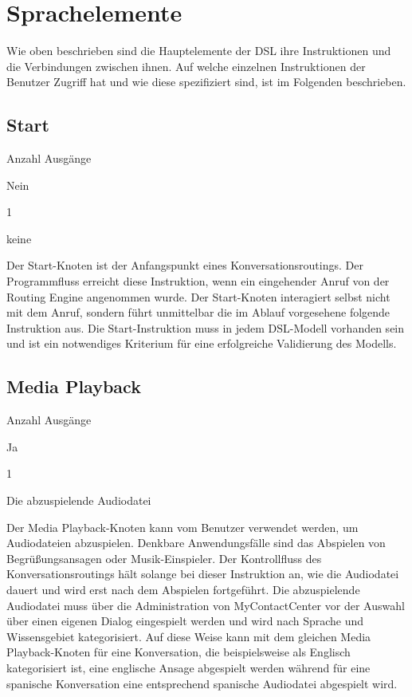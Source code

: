\section{Sprachelemente}
\label{sec:Sprachelemente}
Wie oben beschrieben sind die Hauptelemente der DSL ihre Instruktionen und die Verbindungen zwischen ihnen. Auf welche einzelnen Instruktionen der Benutzer Zugriff hat und wie diese spezifiziert sind, ist im Folgenden beschrieben. 

\subsection{Start}
\begin{labeling}{Anzahl Ausgänge}
\item [Eingang] Nein
\item [Anzahl Ausgänge] 1
\item [Parameter] keine
\item [Beschreibung] Der Start-Knoten ist der Anfangspunkt eines Konversationsroutings. Der Programmfluss erreicht diese Instruktion, wenn ein eingehender Anruf von der Routing Engine angenommen wurde. Der Start-Knoten interagiert selbst nicht mit dem Anruf, sondern führt unmittelbar die im Ablauf vorgesehene folgende Instruktion aus. Die Start-Instruktion muss in jedem DSL-Modell vorhanden sein und ist ein notwendiges Kriterium für eine erfolgreiche Validierung des Modells. 
\end{labeling}

\subsection{Media Playback}
\label{subsec:Media Playback}
\begin{labeling}{Anzahl Ausgänge}
\item [Eingang] Ja
\item [Anzahl Ausgänge] 1
\item [Parameter] Die abzuspielende Audiodatei
\item [Beschreibung] Der Media Playback-Knoten kann vom Benutzer verwendet werden, um Audiodateien abzuspielen. Denkbare Anwendungsfälle sind das Abspielen von Begrüßungsansagen oder Musik-Einspieler. Der Kontrollfluss des Konversationsroutings hält solange bei dieser Instruktion an, wie die Audiodatei dauert und wird erst nach dem Abspielen fortgeführt.  Die abzuspielende Audiodatei muss über die Administration von MyContactCenter vor der Auswahl über einen eigenen Dialog eingespielt werden und wird nach Sprache und Wissensgebiet kategorisiert. Auf diese Weise kann mit dem gleichen Media Playback-Knoten für eine Konversation, die beispielsweise als Englisch kategorisiert ist, eine englische Ansage abgespielt werden während für eine spanische Konversation eine entsprechend spanische Audiodatei abgespielt wird.
\end{labeling}

